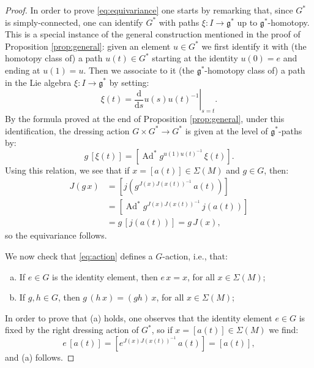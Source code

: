 \documentclass[a4paper,11pt]{amsart}
\theoremstyle{definition}
\theoremstyle{remark}
\begin{document}
\begin{proof}
In order to prove \eqref{eq:equivariance} one starts by remarking that, since $G^*$ is simply-connected, one can
identify $G^*$ with paths $\xi:I\to {\mathfrak{g}}^*$ up to ${\mathfrak{g}}^*$-homotopy. This is a special instance of the general
construction mentioned in the proof of Proposition \ref{prop:general}: given an element $u\in G^*$ we first
identify it with (the homotopy class of) a path $u(t)\in G^*$ starting at the identity $u(0)=e$ and ending at
$u(1)=u$. Then we associate to it (the ${\mathfrak{g}}^*$-homotopy class of) a path in the Lie algebra $\xi:I\to {\mathfrak{g}}^*$ by
setting:
\[ \xi(t)=\left.\frac{\mathrm d}{{\mathrm d} s}u(s)u(t)^{-1}\right|_{s=t}.\]
By the formula proved at the end of Proposition \ref{prop:general}, under this identification, the dressing
action $G\times G^*\to G^*$ is given at the level of ${\mathfrak{g}}^*$-paths by:
\[ g\, [\xi(t)]=[\operatorname{Ad}^*g^{u(1)u(t)^{-1}}\, \xi(t)].\]
Using this relation, we see that if $x=[a(t)]\in\Sigma(M)$ and $g\in G$, then:
\begin{align*}
J(g\, x)&=[j(g^{J(x)J(x(t))^{-1}}\, a(t))]\\
&=[\operatorname{Ad}^*g^{J(x)J(x(t))^{-1}}\, j(a(t))]\\
&=g\, [j(a(t))]=g\, J(x),
\end{align*}
so the equivariance follows.

We now check that \eqref{eq:action} defines a $G$-action, i.e., that:
\begin{enumerate}[(a)]
\item If $e\in G$ is the identity element, then $e\, x=x$, for all
$x\in\Sigma(M)$; \item If $g,h\in G$, then $g\,(h\, x)=(gh)\, x$,
for all $x\in\Sigma(M)$;
\end{enumerate}

In order to prove that (a) holds, one observes that the identity element $e\in G$ is fixed by the right dressing
action of $G^*$, so if $x=[a(t)]\in\Sigma(M)$ we find:
\[ e\, [a(t)]=[e^{J(x)J(x(t))^{-1}}\, a(t)]=[a(t)],\]
and (a) follows.


\end{proof}
\end{document}
